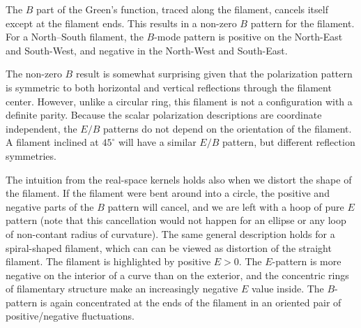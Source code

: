 The $B$ part of the Green's function, traced along the filament, cancels itself except at the filament ends.  This results in a non-zero $B$ pattern for the filament.  For a North--South filament, the $B$-mode pattern is positive on the North-East and South-West, and negative in the North-West and South-East.


The non-zero $B$ result is somewhat surprising given that the polarization pattern is symmetric to both horizontal and vertical reflections through the filament center.  However, unlike a circular ring, this filament is not a configuration with a definite parity.  Because the scalar polarization descriptions are coordinate independent, the $E/B$ patterns do not depend on the orientation of the filament.  A filament inclined at $45^\circ$ will have a similar $E/B$ pattern, but different reflection symmetries.  


The intuition from the real-space kernels holds also when we distort the shape of the filament.  If the filament were bent around into a circle, the positive and negative parts of the $B$ pattern will cancel, and we are left with a hoop of pure $E$ pattern (note that this cancellation would not happen for an ellipse or any loop of non-contant radius of curvature).  The same general description holds for a spiral-shaped filament, which can can be viewed as distortion of the straight filament.  The filament is highlighted by positive $E>0$.  The $E$-pattern is more negative on the interior of a curve than on the exterior, and the concentric rings of filamentary structure make an increasingly negative $E$ value inside.  The $B$-pattern is again concentrated at the ends of the filament in an oriented pair of positive/negative fluctuations. 


